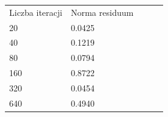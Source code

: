 \documentclass[11pt]{article} %
\begin{document}
\begin{table}[h]
\begin{tabular}{|l|l|lll}
\cline{1-2}
Liczba iteracji & Norma residuum &  &  &  \\ \cline{1-2}
20             & 0.0425            &  &  &  \\ \cline{1-2}
40             & 0.1219            &  &  &  \\ \cline{1-2}
80            &  0.0794                &  &  &  \\ \cline{1-2}
160            &  0.8722              &  &  &  \\ \cline{1-2}
320            &  0.0454               &  &  &  \\ \cline{1-2}
640            &  0.4940              &  &  &  \\ \cline{1-2}
\end{tabular}
\end{table}
\end{document}
